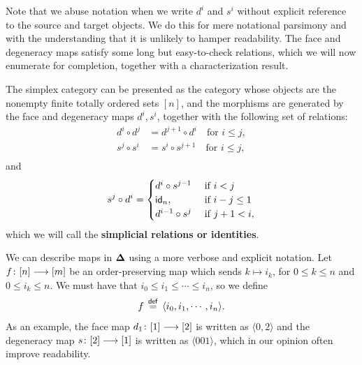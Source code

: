 Note that we abuse notation when we write $d^{i}$ and $s^{i}$ without explicit reference to the source and target objects. We do this for mere notational parsimony and with the understanding that it is unlikely to hamper readability. The face and degeneracy maps satisfy some long but easy-to-check relations, which we will now enumerate for completion, together with a characterization result.

\begin{proposition} 
    The simplex category can be presented as the category whose objects are the nonempty finite totally ordered sets $[n]$, and the morphisms are generated by the face and degeneracy maps $d^{i},s^{i}$, together with the following set of relations:
    \begin{align*}
        d^{i}\circ d^{j} &= d^{j+1} \circ d^{i} \quad \text{for } i\leq j, \\
        s^{j}\circ s^{i} &= s^{i} \circ s^{j+1} \quad \text{for } i\leq j, \\
    \end{align*}
    and
    \begin{equation}
        s^{j}\circ d^{i} = 
        \begin{cases}
           d^{i} \circ s^{j-1} & \text{ if }  i < j \\
           \operatorname{\sf id}_n, & \text{ if } i - j \leq 1 \\
            d^{i-1} \circ s^{j} & \text{ if } j + 1 < i,
        \end{cases}
    \end{equation}
    which we will call the \textbf{simplicial relations or identities}.
\end{proposition}

\begin{notation}
We can describe maps in $\mathbf\Delta$ using a more verbose and explicit notation. Let $f\colon [n] \longrightarrow [m]$ be an order-preserving map which sends $k \mapsto i_k$, for $0\leq k \leq n$ and $0\leq i_k \leq n$. We must have that $i_0 \leq i_1 \leq \cdots \leq i_n$, so we define 
\begin{equation}
    f \, \overset{\sf def}{=} \, \langle i_0, i_1, \cdots, i_n \rangle.
\end{equation}  
As an example, the face map $d_1 \colon [1] \longrightarrow [2]$ is written as $\langle 0,2 \rangle$ and the degeneracy map $s \colon [2] \longrightarrow [1]$ is written as $\langle 001 \rangle$, which in our opinion often improve readability. 
\end{notation}

